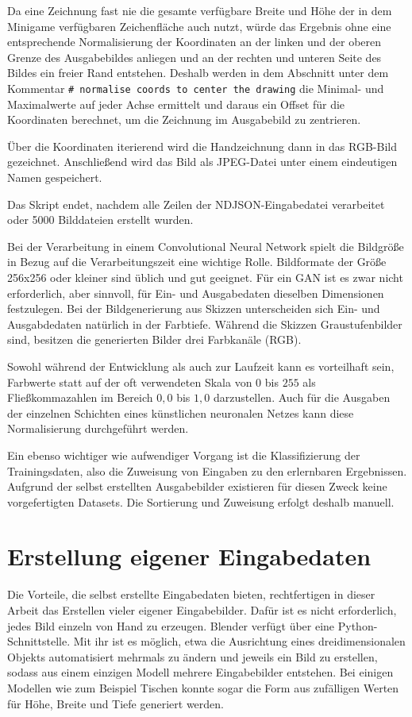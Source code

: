 Da eine Zeichnung fast nie die gesamte verfügbare Breite und Höhe der in dem Minigame verfügbaren Zeichenfläche auch nutzt, würde das Ergebnis ohne eine entsprechende Normalisierung der Koordinaten an der linken und der oberen Grenze des Ausgabebildes anliegen und an der rechten und unteren Seite des Bildes ein freier Rand entstehen. Deshalb werden in dem Abschnitt unter dem Kommentar \lstinline{# normalise coords to center the drawing} die Minimal- und Maximalwerte auf jeder Achse ermittelt und daraus ein Offset für die Koordinaten berechnet, um die Zeichnung im Ausgabebild zu zentrieren.

Über die Koordinaten iterierend wird die Handzeichnung dann in das RGB-Bild gezeichnet. Anschließend wird das Bild als JPEG-Datei unter einem eindeutigen Namen gespeichert.

Das Skript endet, nachdem alle Zeilen der NDJSON-Eingabedatei verarbeitet oder 5000 Bilddateien erstellt wurden.

Bei der Verarbeitung in einem Convolutional Neural Network spielt die Bildgröße
in Bezug auf die Verarbeitungszeit eine wichtige Rolle. Bildformate der Größe 256x256 oder kleiner sind üblich und gut geeignet. Für ein GAN ist es zwar nicht erforderlich, aber sinnvoll, für Ein- und Ausgabedaten dieselben Dimensionen festzulegen. Bei der Bildgenerierung aus Skizzen unterscheiden sich Ein- und Ausgabdedaten natürlich in der Farbtiefe. Während die Skizzen Graustufenbilder sind, besitzen die generierten Bilder drei Farbkanäle (RGB).

Sowohl während der Entwicklung als auch zur Laufzeit kann es vorteilhaft sein, Farbwerte statt auf der oft verwendeten Skala von $0$ bis $255$ als Fließkommazahlen im Bereich $0,0$ bis $1,0$ darzustellen. Auch für die Ausgaben der einzelnen Schichten eines künstlichen neuronalen Netzes kann diese Normalisierung durchgeführt werden.

Ein ebenso wichtiger wie aufwendiger Vorgang ist die Klassifizierung der Trainingsdaten, also die Zuweisung von Eingaben zu den erlernbaren Ergebnissen. Aufgrund der selbst erstellten Ausgabebilder existieren für diesen Zweck keine vorgefertigten Datasets. Die Sortierung und Zuweisung erfolgt deshalb manuell.
\pagebreak

\section{Erstellung eigener Eingabedaten}
\label{sec:inputdata}

Die Vorteile, die selbst erstellte Eingabedaten bieten, rechtfertigen in dieser Arbeit das Erstellen vieler eigener Eingabebilder. Dafür ist es nicht erforderlich, jedes Bild einzeln von Hand zu erzeugen. Blender verfügt über eine Python-Schnittstelle. Mit ihr ist es möglich, etwa die Ausrichtung eines dreidimensionalen Objekts automatisiert mehrmals zu ändern und jeweils ein Bild zu erstellen, sodass aus einem einzigen Modell mehrere Eingabebilder entstehen. Bei einigen Modellen wie zum Beispiel Tischen konnte sogar die Form aus zufälligen Werten für Höhe, Breite und Tiefe generiert werden.

